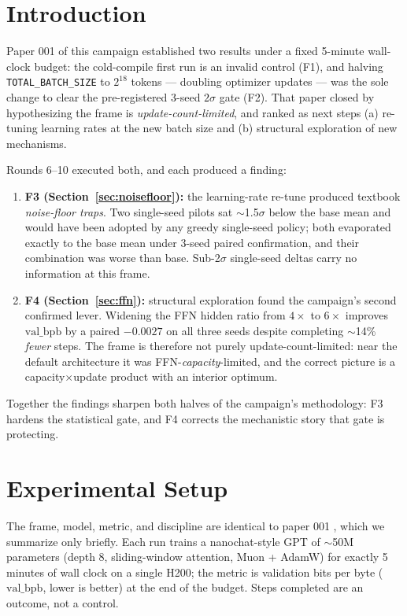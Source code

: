 \documentclass{article}
\newcommand{\valbpb}{\mathrm{val\_bpb}}
\begin{document}
\section{Introduction}
\label{sec:intro}

Paper 001 of this campaign \cite{ophis2026paper001} established two results under a fixed 5-minute wall-clock budget: the cold-compile first run is an invalid control (F1), and halving \texttt{TOTAL\_BATCH\_SIZE} to $2^{18}$ tokens --- doubling optimizer updates --- was the sole change to clear the pre-registered 3-seed $2\sigma$ gate (F2). That paper closed by hypothesizing the frame is \emph{update-count-limited}, and ranked as next steps (a) re-tuning learning rates at the new batch size and (b) structural exploration of new mechanisms.

Rounds 6--10 executed both, and each produced a finding:

\begin{enumerate}
    \item \textbf{F3 (Section~\ref{sec:noisefloor}):} the learning-rate re-tune produced textbook \emph{noise-floor traps}. Two single-seed pilots sat $\sim$1.5$\sigma$ below the base mean and would have been adopted by any greedy single-seed policy; both evaporated exactly to the base mean under 3-seed paired confirmation, and their combination was worse than base. Sub-2$\sigma$ single-seed deltas carry no information at this frame.
    \item \textbf{F4 (Section~\ref{sec:ffn}):} structural exploration found the campaign's second confirmed lever. Widening the FFN hidden ratio from $4\times$ to $6\times$ improves $\valbpb$ by a paired $-0.0027$ on all three seeds despite completing $\sim$14\% \emph{fewer} steps. The frame is therefore not purely update-count-limited: near the default architecture it was FFN-\emph{capacity}-limited, and the correct picture is a capacity$\times$update product with an interior optimum.
\end{enumerate}

Together the findings sharpen both halves of the campaign's methodology: F3 hardens the statistical gate, and F4 corrects the mechanistic story that gate is protecting.

\section{Experimental Setup}
\label{sec:setup}

The frame, model, metric, and discipline are identical to paper 001 \cite{ophis2026paper001}, which we summarize only briefly. Each run trains a nanochat-style GPT \cite{karpathy2025nanochat} of $\sim$50M parameters (depth 8, sliding-window attention, Muon \cite{jordan2024muon} + AdamW) for exactly 5 minutes of wall clock on a single H200; the metric is validation bits per byte ($\valbpb$, lower is better) at the end of the budget. Steps completed are an outcome, not a control.
\end{document}
